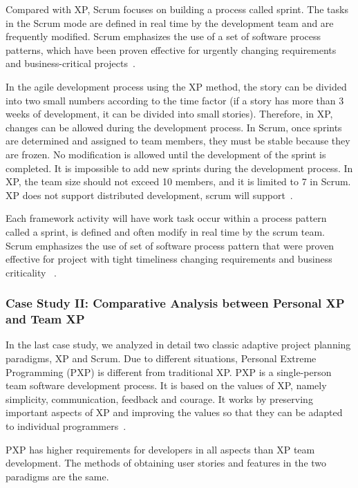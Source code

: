 \documentclass{sigchi}
\begin{document}
Compared with XP, Scrum focuses on building a process called sprint. The tasks in the Scrum mode are defined in real time by the development team and are frequently modified. Scrum emphasizes the use of a set of software process patterns, which have been proven effective for urgently changing requirements and business-critical projects~\cite{boehm_software_2001,kumar_agile_2012}.

In the agile development process using the XP method, the story can be divided into two small numbers according to the time factor (if a story has more than 3 weeks of development, it can be divided into small stories). Therefore, in XP, changes can be allowed during the development process. In Scrum, once sprints are determined and assigned to team members, they must be stable because they are frozen. No modification is allowed until the development of the sprint is completed. It is impossible to add new sprints during the development process. In XP, the team size should not exceed 10 members, and it is limited to 7 in Scrum. XP does not support distributed development, scrum will support~\cite{boehm_software_2001,kumar_agile_2012}.

Each framework activity will have work task
occur within a process pattern called a sprint, is defined and often modify in real time by the scrum team. Scrum emphasizes the use of set of software process pattern that were proven effective for project with tight timeliness changing requirements and business criticality ~\cite{boehm_software_2001,kumar_agile_2012}.


\subsubsection{Case Study II: Comparative Analysis between Personal XP and Team XP } 

In the last case study, we analyzed in detail two classic adaptive project planning paradigms, XP and Scrum. Due to different situations, Personal Extreme Programming (PXP) is different from traditional XP. PXP is a single-person team software development process. It is based on the values of XP, namely simplicity, communication, feedback and courage. It works by preserving important aspects of XP and improving the values so that they can be adapted to individual programmers~\cite{agarwal_extreme_2008,boehm_software_2001}.

PXP has higher requirements for developers in all aspects than XP team development. The methods of obtaining user stories and features in the two paradigms are the same.
\end{document}

